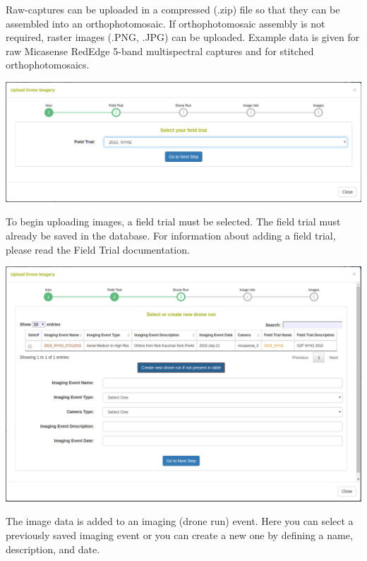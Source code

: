 \documentclass[
  12pt,
]{book}
\begin{document}
Raw-captures can be uploaded in a compressed (.zip) file so that they can be assembled into an orthophotomosaic. If orthophotomosaic assembly is not required, raster images (.PNG, .JPG) can be uploaded. Example data is given for raw Micasense RedEdge 5-band multispectral captures and for stitched orthophotomosaics.

\begin{center}\includegraphics[width=0.95\linewidth]{assets/images/manage_image_phenotyping_upload_field_trial} \end{center}

To begin uploading images, a field trial must be selected. The field trial must already be saved in the database. For information about adding a field trial, please read the Field Trial documentation.

\begin{center}\includegraphics[width=0.95\linewidth]{assets/images/manage_image_phenotyping_upload_drone_run} \end{center}

The image data is added to an imaging (drone run) event. Here you can select a previously saved imaging event or you can create a new one by defining a name, description, and date.
\end{document}
